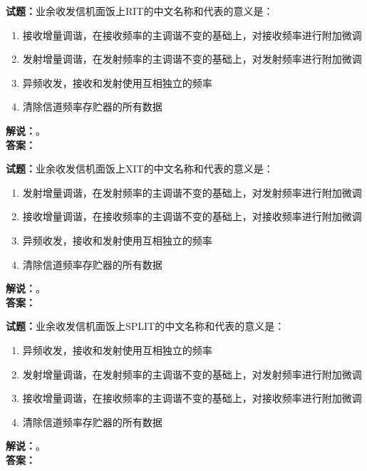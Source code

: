 \documentclass{ctexbook}
\begin{document}
\vspace{\baselineskip}

\noindent\textbf{试题：}业余收发信机面饭上RIT的中文名称和代表的意义是：
\begin{enumerate}[leftmargin=3em]
  \item 接收增量调谐，在接收频率的主调谐不变的基础上，对接收频率进行附加微调
  \item 发射增量调谐，在发射频率的主调谐不变的基础上，对发射频率进行附加微调
  \item 异频收发，接收和发射使用互相独立的频率
  \item 清除信道频率存贮器的所有数据
\end{enumerate}
\noindent\textbf{解说：}\textbf{}。\\\noindent\textbf{答案：}

\vspace{\baselineskip}

\noindent\textbf{试题：}业余收发信机面饭上XIT的中文名称和代表的意义是：
\begin{enumerate}[leftmargin=3em]
  \item 发射增量调谐，在发射频率的主调谐不变的基础上，对发射频率进行附加微调
  \item 接收增量调谐，在接收频率的主调谐不变的基础上，对接收频率进行附加微调
  \item 异频收发，接收和发射使用互相独立的频率
  \item 清除信道频率存贮器的所有数据
\end{enumerate}
\noindent\textbf{解说：}\textbf{}。\\\noindent\textbf{答案：}

\vspace{\baselineskip}

\noindent\textbf{试题：}业余收发信机面饭上SPLIT的中文名称和代表的意义是：
\begin{enumerate}[leftmargin=3em]
  \item 异频收发，接收和发射使用互相独立的频率
  \item 发射增量调谐，在发射频率的主调谐不变的基础上，对发射频率进行附加微调
  \item 接收增量调谐，在接收频率的主调谐不变的基础上，对接收频率进行附加微调
  \item 清除信道频率存贮器的所有数据
\end{enumerate}
\noindent\textbf{解说：}\textbf{}。\\\noindent\textbf{答案：}

\vspace{\baselineskip}
\end{document}

